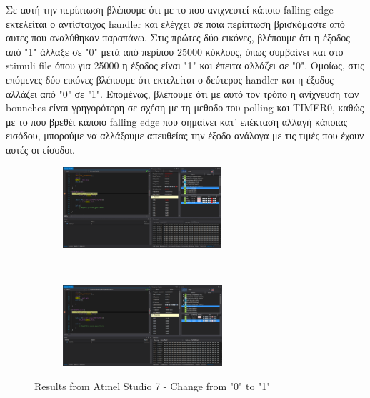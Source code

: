\documentclass{article}
\begin{document}
	\noindent
	Σε αυτή την περίπτωση βλέπουμε ότι με το που ανιχνευτεί κάποιο falling edge εκτελείται ο αντίστοιχος handler και ελέγχει σε ποια περίπτωση βρισκόμαστε από αυτες που αναλύθηκαν παραπάνω. Στις πρώτες δύο εικόνες, βλέπουμε ότι η έξοδος από "1" άλλαξε σε "0" μετά από περίπου 25000 κύκλους, όπως συμβαίνει και στο stimuli file όπου για 25000 η έξοδος είναι "1" και έπειτα αλλάζει σε "0". Ομοίως, στις επόμενες δύο εικόνες βλέπουμε ότι εκτελείται ο δεύτερος handler και η έξοδος αλλάζει από "0" σε "1".	Επομένως, βλέπουμε ότι με αυτό τον τρόπο η ανίχνευση των bounches είναι γρηγορότερη σε σχέση με τη μεθοδο του polling και TIMER0, καθώς με το που βρεθέι κάποιο falling edge που σημαίνει κατ' επέκταση αλλαγή κάποιας εισόδου, μπορούμε να αλλάξουμε απευθείας την έξοδο ανάλογα με τις τιμές που έχουν αυτές οι είσοδοι. 
	\pagebreak
	\begin{figure}[h!]
		\centering
		\begin{subfigure}[t]{0.5\textwidth}
			\centering
			\includegraphics[height=3cm, width=\linewidth]{./results/lab9_sim_a_b.png}
		\end{subfigure}%
		~
		\begin{subfigure}[t]{0.5\textwidth}
			\centering
			\includegraphics[height=3cm, width=\linewidth]{./results/lab9_sim_b_b.png}
		\end{subfigure}
		\caption{Results from Αtmel Studio 7 - Change from "0" to "1"}
		

\end{figure}
\end{document}
